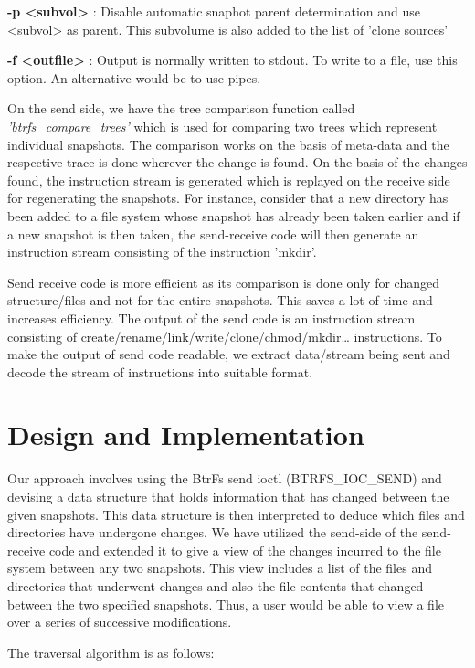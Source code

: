 \documentclass[final]{ols}
\begin{document}
\textbf{-p <subvol>} : Disable automatic snaphot parent determination and use <subvol> as parent. This subvolume is also added to the list of 'clone sources'
        
\textbf{-f <outfile>} : Output is normally written to stdout. To write to a file, use this option. An alternative would be to use pipes.

On the send side, we have the tree comparison function called \textit{'btrfs\_compare\_trees'} which is used for comparing two trees which represent individual snapshots. The comparison works on the basis of meta-data and the respective trace is done wherever the change is found. On the basis of the changes found, the instruction stream is generated which is replayed on the receive side for regenerating the snapshots. For instance, consider that a new directory has been added to a file system whose snapshot has already been taken earlier and if a new snapshot is then taken, the send-receive code will then generate an instruction stream consisting of the instruction 'mkdir'.

Send receive code is more efficient as its comparison is done only for changed structure/files and not for the entire snapshots. This saves a lot of time and increases efficiency. The output of the send code is an instruction stream consisting of create/rename/link/write/clone/chmod/mkdir… instructions. To make the output of send code readable, we extract data/stream being sent and decode the stream of instructions into suitable format.

\section{Design and Implementation}\label{lockhart-DesignAndImplementation}
Our approach involves using the BtrFs send ioctl (BTRFS\_IOC\_SEND) and devising a data structure that holds information that has changed between the given snapshots. This data structure is then interpreted to deduce which files and directories have undergone changes. We have utilized the send-side of the send-receive code and extended it to give a view of the changes incurred to the file system between any two snapshots. This view includes a list of the files and directories that underwent changes and also the file contents that changed between the two specified snapshots. Thus, a user would be able to view a file over a series of successive modifications. 

The traversal algorithm is as follows:
 
\end{document}
